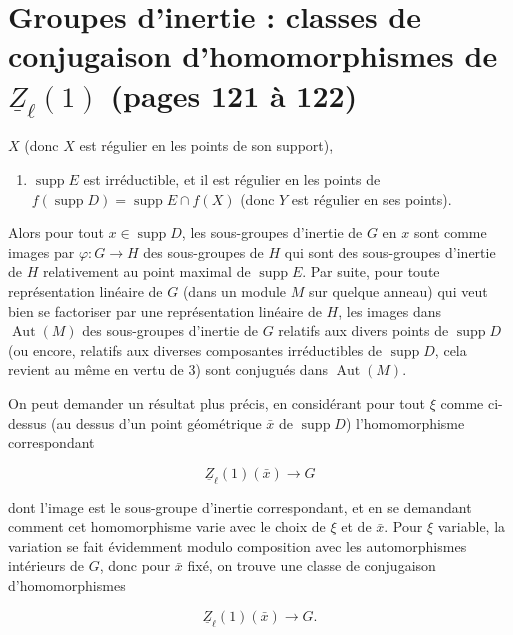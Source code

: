 \documentclass[11pt,a4paper]{article}
\begin{document}
\section*{Groupes d'inertie : classes de conjugaison d'homomorphismes de $\underline{Z}_{\ell}(1)$ (pages 121 à 122)}


$X$ (donc  $X$ est régulier en les points de son support),

\begin{enumerate}
\item[b)] $\operatorname{supp} E$ est irréductible, et il est régulier en les
points de $f(\operatorname{supp} D) = \operatorname{supp} E \cap f(X)$ (donc $Y$
est régulier en ses points).
\end{enumerate}

Alors pour tout $x \in \operatorname{supp} D$,  les
sous-groupes d'inertie de $G$ en $x$ sont comme images par $\varphi : G \to H$
des sous-groupes de $H$ qui sont des sous-groupes d'inertie de $H$
relativement au point maximal de $\operatorname{supp} E$. Par suite, pour toute
représentation linéaire de $G$ (dans un module $M$ sur quelque anneau)
\struck{\ill{}} qui veut bien se factoriser par une représentation linéaire de
$H$, les images dans $\operatorname{Aut}(M)$ des sous-groupes d'inertie
 de $G$ relatifs aux divers points de $\operatorname{supp} D$ (ou
encore, relatifs aux diverses composantes irréductibles de $\operatorname{supp}
D$, cela revient au même en vertu de 3) sont conjugués dans
$\operatorname{Aut}(M)$. 

 On peut demander  un résultat plus précis, en
considérant pour tout $\xi$ comme ci-dessus (au dessus d'un point géométrique
$\bar{x}$ de $\operatorname{supp} D$) l'homomorphisme correspondant

\[ \underline{Z}_{\ell}(1)(\bar{x}) \to G \]

dont l'image est le sous-groupe d'inertie correspondant, et en se demandant
comment cet homomorphisme varie avec le choix de $\xi$ et de $\bar{x}$. Pour
$\xi$ variable, la variation se fait évidemment modulo composition avec les
automorphismes intérieurs de $G$, 
donc pour $\bar{x}$ fixé, on trouve une classe de conjugaison d'homomorphismes

\[ \underline{Z}_{\ell}(1)(\bar{x}) \to G. \]
\end{document}
